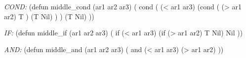 \documentclass[a4paper,12pt]{article}
\begin{document}
	\textit{COND:}
	(defun middle\_cond (ar1 ar2 ar3) (
	cond ( 
	(< ar1 ar3) (cond (
	(> ar1 ar2) T
	) 
	(T Nil) 
	)
	)
	(T Nil)
	))
	\vspace*{15mm} 
	
	\textit{IF:}
	(defun middle\_if (ar1 ar2 ar3) (
	if (< ar1 ar3) (if (> ar1 ar2) T Nil) Nil
	))
	
	\vspace*{15mm} 
	
	\textit{AND:}
	(defun middle\_and (ar1 ar2 ar3) (
	and (< ar1 ar3) (> ar1 ar2)
	))
	
	\vspace*{15mm} 
\end{document}
